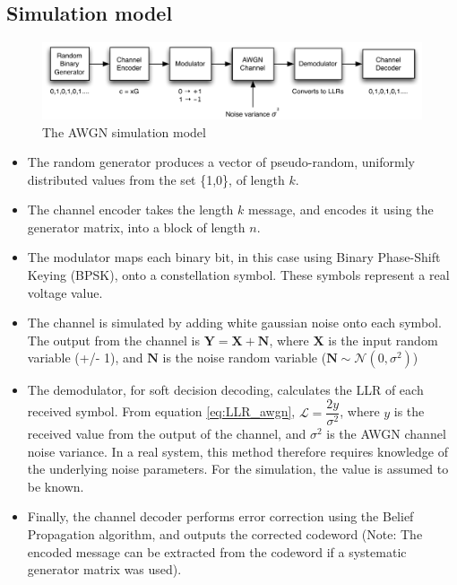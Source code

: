 \documentclass[11pt]{article}
\numberwithin{equation}{subsection}
\begin{document}
\subsection{Simulation model}
\begin{figure}[h]
\centering
\includegraphics[scale=0.878]{awgn_channel_model}
\caption{The AWGN simulation model}
\label{figure:awgn sim model}
\end{figure}

\begin{itemize}
\item The random generator produces a vector of pseudo-random, uniformly distributed values from the set \{1,0\}, of length $k$.
\item The channel encoder takes the length $k$ message, and encodes it using the generator matrix, into a block of length $n$.
\item The modulator maps each binary bit, in this case using Binary Phase-Shift Keying (BPSK), onto a constellation symbol. These symbols represent a real voltage value.
\item The channel is simulated by adding white gaussian noise onto each symbol. The output from the channel is $\mathbf{Y = X + N}$, where $\mathbf{X}$ is the input random variable (+/- 1), and $\mathbf{N}$ is the noise random variable ($\mathbf{N} \sim \mathcal{N}(0,\sigma^2)$)
\item The demodulator, for soft decision decoding, calculates the LLR of each received symbol. From equation \ref{eq:LLR_awgn}, $\mathcal{L} = \dfrac{2y}{\sigma^2}$, where $y$ is the received value from the output of the channel, and $\sigma^2$ is the AWGN channel noise variance. In a real system, this method therefore requires knowledge of the underlying noise parameters. For the simulation, the value is assumed to be known.
\item Finally, the channel decoder performs error correction using the Belief Propagation algorithm, and outputs the corrected codeword (Note: The encoded message can be extracted from the codeword if a systematic generator matrix was used).
\end{itemize}
\end{document}
